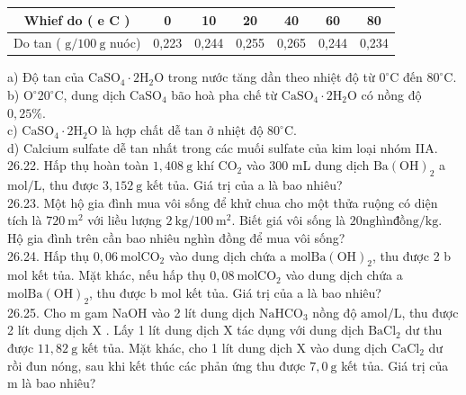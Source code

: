 \documentclass[10pt]{article}
\begin{document}
\begin{center}
\begin{tabular}{|c|c|c|c|c|c|c|}
\hline
Whief do ( e C ) & 0 & 10 & 20 & 40 & 60 & 80 \\
\hline
Do tan ( $\mathrm{g} / 100 \mathrm{~g}$ nuóc) & 0,223 & 0,244 & 0,255 & 0,265 & 0,244 & 0,234 \\
\hline
\end{tabular}
\end{center}

a) Độ tan của $\mathrm{CaSO}_{4} \cdot 2 \mathrm{H}_{2} \mathrm{O}$ trong nước tăng dần theo nhiệt độ từ $0^{\circ} \mathrm{C}$ đến $80^{\circ} \mathrm{C}$.\\
b) $\mathrm{O}^{\circ} 20^{\circ} \mathrm{C}$, dung dịch $\mathrm{CaSO}_{4}$ bão hoà pha chế từ $\mathrm{CaSO}_{4} \cdot 2 \mathrm{H}_{2} \mathrm{O}$ có nồng độ $0,25 \%$.\\
c) $\mathrm{CaSO}_{4} \cdot 2 \mathrm{H}_{2} \mathrm{O}$ là hợp chất dễ tan ở nhiệt độ $80^{\circ} \mathrm{C}$.\\
d) Calcium sulfate dễ tan nhất trong các muối sulfate của kim loại nhóm IIA.\\
26.22. Hấp thụ hoàn toàn $1,408 \mathrm{~g}$ khí $\mathrm{CO}_{2}$ vào 300 mL dung dịch $\mathrm{Ba}(\mathrm{OH})_{2}$ a $\mathrm{mol} / \mathrm{L}$, thu được $3,152 \mathrm{~g}$ kết tủa. Giá trị của a là bao nhiêu?\\
26.23. Một hộ gia đình mua vôi sống để khử chua cho một thửa ruộng có diện tích là $720 \mathrm{~m}^{2}$ với liều lượng $2 \mathrm{~kg} / 100 \mathrm{~m}^{2}$. Biết giá vôi sống là $20 \mathrm{nghìn} \mathrm{đồng/kg}$. Hộ gia đình trên cần bao nhiêu nghìn đồng để mua vôi sống?\\
26.24. Hấp thụ $0,06 \mathrm{~mol} \mathrm{CO}_{2}$ vào dung dịch chứa a $\mathrm{mol} \mathrm{Ba}(\mathrm{OH})_{2}$, thu được 2 b mol kết tủa. Mặt khác, nếu hấp thụ $0,08 \mathrm{~mol} \mathrm{CO}_{2}$ vào dung dịch chứa a $\mathrm{mol} \mathrm{Ba}(\mathrm{OH})_{2}$, thu được b mol kết tủa. Giá trị của a là bao nhiêu?\\
26.25. Cho m gam NaOH vào 2 lít dung dịch $\mathrm{NaHCO}_{3}$ nồng độ $\mathrm{a} \mathrm{mol} / \mathrm{L}$, thu được 2 lít dung dịch X . Lấy 1 lít dung dịch X tác dụng với dung dịch $\mathrm{BaCl}_{2}$ dư thu được $11,82 \mathrm{~g}$ kết tủa. Mặt khác, cho 1 lít dung dịch X vào dung dịch $\mathrm{CaCl}_{2}$ dư rồi đun nóng, sau khi kết thúc các phản ứng thu được $7,0 \mathrm{~g}$ kết tủa. Giá trị của m là bao nhiêu?
\end{document}
